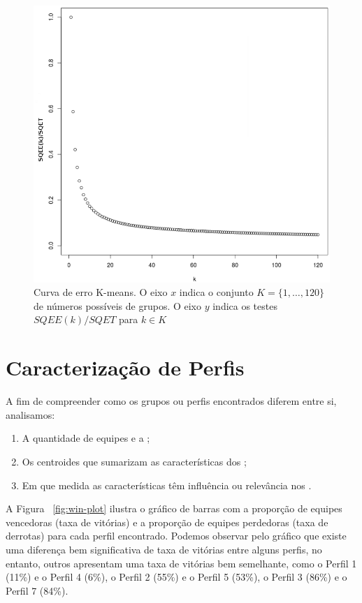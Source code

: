 \begin{figure}
  \centering
  \includegraphics[width=1\textwidth]{k-means}%
  \caption{Curva de erro K-means. O eixo $x$ indica o conjunto $K=\{1, \ldots, 120\}$ de números possíveis de grupos. O eixo $y$ indica os testes $SQEE(k)/SQET$ para $k \in K $}
  \label{fig:k-means-curve}
\end{figure}

\section{Caracterização de Perfis}
A fim de compreender como os grupos ou perfis encontrados diferem entre si, analisamos:

\begin{enumerate}[label=(\roman*)]
 \item A quantidade de equipes e a ;
 \item Os centroides que sumarizam as características dos ;
 \item Em que medida as características têm influência ou relevância nos .
\end{enumerate}

A Figura ~\ref{fig:win-plot} ilustra o gr\'afico de barras com a propor\c{c}\~ao de equipes vencedoras (taxa de vit\'orias) e a propor\c{c}\~ao de equipes perdedoras (taxa de derrotas) para cada perfil encontrado. Podemos observar pelo gr\'afico que existe uma diferença bem significativa de taxa de vit\'orias entre alguns perfis, no entanto, outros apresentam uma taxa de vit\'orias bem semelhante, como o Perfil 1 (11\%) e o Perfil 4 (6\%), o Perfil 2 (55\%) e o Perfil 5 (53\%), o Perfil 3 (86\%) e o Perfil 7 (84\%).

